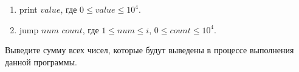 \begin{problem}
\begin{enumerate}
    \item print $value$, где $0 \le value \le 10^4$.
    \item jump $num$ $count$, где $1 \le num \le i$, $0 \le count \le 10^4$.
\end{enumerate}

\OutputFile

Выведите сумму всех чисел, которые будут выведены в процессе выполнения данной программы.

\Examples

\begin{example}
%
%
\end{example}
\end{problem}